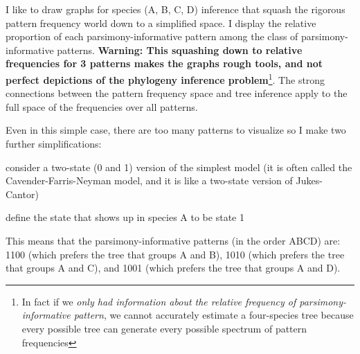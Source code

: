 \documentclass[11pt]{article}
\begin{document}
I like to draw graphs for species (A, B, C, D) inference that squash the rigorous pattern frequency world down to a simplified space.
I display the relative proportion of each parsimony-informative pattern among the class of parsimony-informative patterns.
{\bf Warning: This squashing down to relative frequencies for 3 patterns makes the graphs rough tools, and not perfect depictions of the phylogeny inference problem}\footnote{In fact if we {\em only had information about the relative frequency of parsimony-informative pattern}, we cannot accurately estimate a four-species tree because every possible tree can generate every possible spectrum of pattern frequencies\citep{AllmanHR2010}}. 
The strong connections between the pattern frequency space and tree inference apply to the full space of the frequencies over all patterns.

Even in this simple case, there are too many patterns to visualize so I make two further simplifications:
\begin{compactitem}
	\item consider a two-state (0 and 1) version of the simplest model (it is often called the Cavender-Farris-Neyman model, and it is like a two-state version of Jukes-Cantor)
	\item define the state that shows up in species A to be state 1
\end{compactitem}
This means that the parsimony-informative patterns (in the order ABCD) are: 1100 (which prefers the tree that groups A and B), 1010 (which prefers the tree that groups A and C), and 1001 (which prefers the tree that groups A and D).
\end{document}
